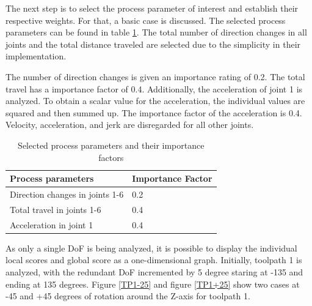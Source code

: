 The next step is to select the process parameter of interest and establish their respective weights. For that, a basic case is discussed. The selected process parameters can be found in table \ref{PPbasic}. The total number of direction changes in all joints and the total distance traveled are selected due to the simplicity in their implementation.

The number of direction changes is given an importance rating of 0.2.
The total travel has a importance factor of 0.4. Additionally, the acceleration of joint 1 is analyzed. To obtain a scalar value for the acceleration, the individual values are squared and then summed up. The importance factor of the acceleration is 0.4.
Velocity, acceleration, and jerk are disregarded for all other joints.

\begin{table}[H]
	\centering
	\begin{tabular}{||l|l||}
		Process parameters& Importance Factor \\
		\hline
		\hline
		\hline
		Direction changes in joints 1-6	&		0.2 \\
		Total travel in joints 1-6	&  	0.4 \\
		Acceleration in joint 1	& 		0.4\\
		
		\hline
		\hline
	\end{tabular}
	
	\caption{Selected process parameters and their importance factors}
	\label{PPbasic}
\end{table}


As only a single DoF is being analyzed, it is possible to display the individual local scores and global score as a one-dimensional graph. Initially, toolpath 1 is analyzed, with the redundant DoF incremented by 5 degree staring at -135 and ending at 135 degrees. 
Figure \ref{TP1-25} and figure \ref{TP1+25} show two cases at -45 and +45 degrees of rotation around the Z-axis for toolpath 1.

